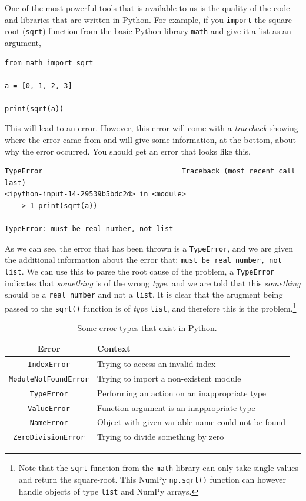 \documentclass[a4paper]{article}
\begin{document}
One of the most powerful tools that is available to us is the quality of the code and libraries that are written in Python.
For example, if you \texttt{import} the square-root (\texttt{sqrt}) function from the basic Python library \texttt{math} and give it a list as an argument,
\begin{lstlisting}
from math import sqrt

a = [0, 1, 2, 3]

print(sqrt(a))
\end{lstlisting}
This will lead to an error.
However, this error will come with a \emph{traceback} showing where the error came from and will give some information, at the bottom, about why the error occurred.
You should get an error that looks like this,
\begin{lstlisting}
TypeError                                 Traceback (most recent call last)
<ipython-input-14-29539b5bdc2d> in <module>
----> 1 print(sqrt(a))

TypeError: must be real number, not list
\end{lstlisting}
As we can see, the error that has been thrown is a \texttt{TypeError}, and we are given the additional information about the error that: \texttt{must be real number, not list}.
We can use this to parse the root cause of the problem, a \texttt{TypeError} indicates that \emph{something} is of the wrong \emph{type}, and we are told that this \emph{something} should be a \texttt{real number} and not a \texttt{list}.
It is clear that the arugment being passed to the \texttt{sqrt()} function is of \emph{type} \texttt{list}, and therefore this is the problem.\footnote{Note that the \texttt{sqrt} function from the \texttt{math} library can only take single values and return the square-root. This NumPy \texttt{np.sqrt()} function can however handle objects of type \texttt{list} and NumPy arrays.}
\begin{table}[h]
	\centering
	\caption{Some error types that exist in Python.}
	\label{tab:ops}
	\begin{tabular}{c p{}}
		\hline
		Error & Context \\
		\hline
		\texttt{IndexError} & Trying to access an invalid index \\
		\texttt{ModuleNotFoundError} & Trying to import a non-existent module \\
		\texttt{TypeError} & Performing an action on an inappropriate type \\
		\texttt{ValueError} & Function argument is an inappropriate type \\
		\texttt{NameError} & Object with given variable name could not be found \\
		\texttt{ZeroDivisionError} & Trying to divide something by zero \\
		\hline
	\end{tabular}
\end{table}
\end{document}
